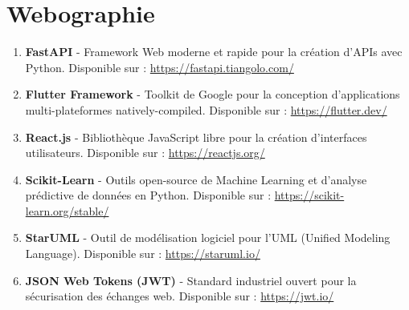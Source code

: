 \documentclass[12pt,a4paper]{report}
\begin{document}
\chapter*{Webographie}
\begin{enumerate}
    \item \textbf{FastAPI} - Framework Web moderne et rapide pour la création d'APIs avec Python. Disponible sur : \url{https://fastapi.tiangolo.com/}
    \item \textbf{Flutter Framework} - Toolkit de Google pour la conception d'applications multi-plateformes natively-compiled. Disponible sur : \url{https://flutter.dev/}
    \item \textbf{React.js} - Bibliothèque JavaScript libre pour la création d'interfaces utilisateurs. Disponible sur : \url{https://reactjs.org/}
    \item \textbf{Scikit-Learn} - Outils open-source de Machine Learning et d'analyse prédictive de données en Python. Disponible sur : \url{https://scikit-learn.org/stable/}
    \item \textbf{StarUML} - Outil de modélisation logiciel pour l'UML (Unified Modeling Language). Disponible sur : \url{https://staruml.io/}
    \item \textbf{JSON Web Tokens (JWT)} - Standard industriel ouvert pour la sécurisation des échanges web. Disponible sur : \url{https://jwt.io/}
\end{enumerate}
\end{document}
